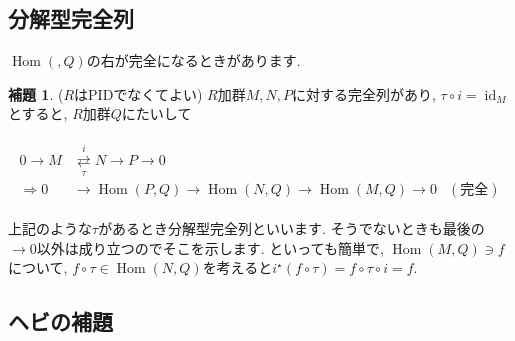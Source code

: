 \documentclass{jsarticle}
\newcommand{\makeop}[1]{\mathop{\mathrm{#1}}\nolimits}
\def\Hom{\makeop{Hom}}
\def\id{\makeop{id}}
\theoremstyle{definition}
\newtheorem{lemma}{補題}
\numberwithin{theorem}{section}
\begin{document}
\subsection{分解型完全列}
$\Hom(, Q)$の右が完全になるときがあります.

\begin{lemma}
($R$はPIDでなくてよい) $R$加群$M, N, P$に対する完全列があり, $\tau\circ i = \id_M$とすると, $R$加群$Q$にたいして

\begin{eqnarray*}
\begin{aligned}
0 \rightarrow M &\overset{i}{\underset{\tau}{\rightleftarrows}} N \rightarrow P \rightarrow 0\\
\Rightarrow 0 &\rightarrow \Hom(P, Q) \rightarrow \Hom(N, Q) \rightarrow \Hom(M, Q) \rightarrow 0 &(完全)
\end{aligned}
\end{eqnarray*}
\end{lemma}

上記のような$\tau$があるとき分解型完全列といいます. そうでないときも最後の$\rightarrow 0$以外は成り立つのでそこを示します.
といっても簡単で, $\Hom(M, Q) \ni f$について, $f\circ\tau \in \Hom(N, Q)$を考えると$i^\star(f\circ\tau) = f\circ\tau\circ i = f$.

\subsection{ヘビの補題}
\end{document}
